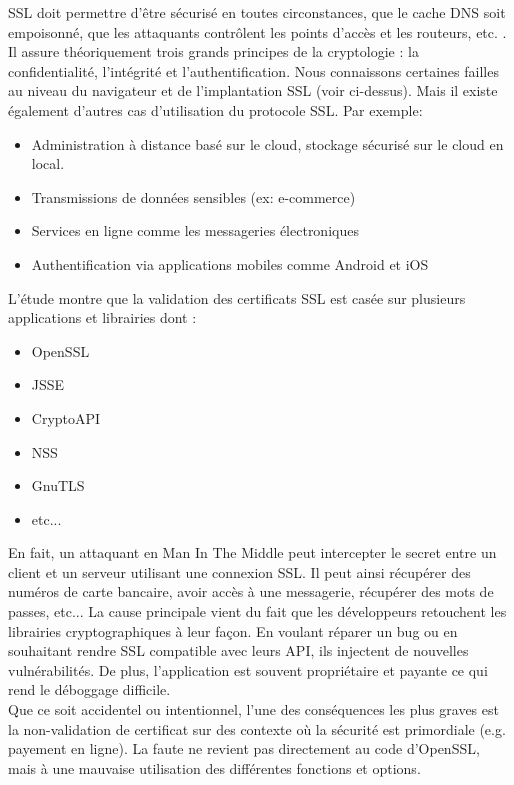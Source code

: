 			
			SSL doit permettre d'être sécurisé en toutes circonstances, que le cache DNS soit empoisonné, que les attaquants contrôlent les points d'accès et les routeurs, etc. . Il assure théoriquement trois grands principes de la cryptologie : la confidentialité, l'intégrité et l'authentification. Nous connaissons certaines failles au niveau du navigateur et de l'implantation SSL (voir ci-dessus). Mais il existe également d'autres cas d'utilisation du protocole SSL. Par exemple:
			\begin{itemize}
			\item Administration à distance basé sur le cloud, stockage sécurisé sur le cloud en local.
			\item Transmissions de données sensibles (ex: e-commerce)
			\item Services en ligne comme les messageries électroniques
			\item Authentification via applications mobiles comme Android et iOS\\
			\end{itemize}
			
			L'étude montre que la validation des certificats SSL est casée sur plusieurs applications et librairies dont :
			\begin{itemize}
			\item OpenSSL
			\item JSSE
			\item CryptoAPI
			\item NSS
			\item GnuTLS
			\item etc...\\
			\end{itemize} 
			
			En fait, un attaquant en Man In The Middle peut intercepter le secret entre un client et un serveur utilisant une connexion SSL. Il peut ainsi  récupérer des numéros de carte bancaire, avoir accès à une messagerie, récupérer des mots de passes, etc... La cause principale vient du fait que les développeurs retouchent les librairies cryptographiques à leur façon. En voulant réparer un bug ou en souhaitant rendre SSL compatible avec leurs API, ils injectent de nouvelles vulnérabilités. 	De plus, l'application est souvent propriétaire et payante ce qui rend le déboggage difficile.\\
			
			
			Que ce soit accidentel ou intentionnel, l'une des conséquences les plus graves est la non-validation de certificat sur des contexte où la sécurité est primordiale (e.g. payement en ligne). La faute ne revient pas directement au code d'OpenSSL, mais à une mauvaise utilisation des différentes fonctions et options.\\
			
